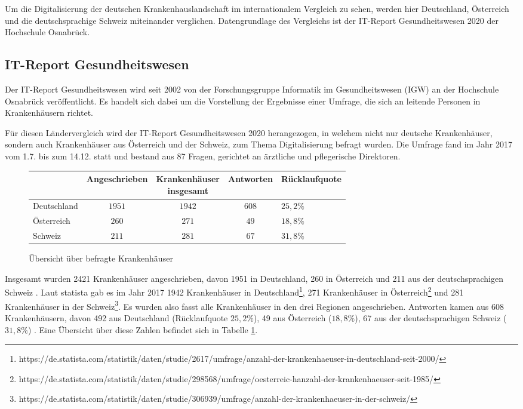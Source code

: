 Um die Digitalisierung der deutschen Krankenhauslandschaft im internationalem Vergleich zu sehen, werden hier Deutschland, Österreich und die deutschsprachige Schweiz miteinander verglichen. Datengrundlage des Vergleichs ist der IT-Report Gesundheitswesen 2020 der Hochschule Osnabrück.
\subsection{IT-Report Gesundheitswesen}
Der IT-Report Gesundheitswesen wird seit 2002 von der Forschungsgruppe Informatik im Gesundheitswesen (IGW) an der Hochschule Osnabrück veröffentlicht. Es handelt sich dabei um die Vorstellung der Ergebnisse einer Umfrage, die sich an leitende Personen in Krankenhäusern richtet. \parencite{huebner2019}

Für diesen Ländervergleich wird der IT-Report Gesundheitswesen 2020 herangezogen, in welchem nicht nur deutsche Krankenhäuser, sondern auch Krankenhäuser aus Österreich und der Schweiz, zum Thema Digitalisierung befragt wurden. Die Umfrage fand im Jahr 2017 vom 1.7. bis zum 14.12. statt und bestand aus 87 Fragen, gerichtet an ärztliche und pflegerische Direktoren.
\begin{figure}[h]
\begin{center}
	\begin{tabular}{l|c|c|c|l}
		&Angeschrieben&\parbox[c]{13ex}{\centering Krankenhäuser\\ insgesamt}&Antworten&Rücklaufquote\\
		\hline
		Deutschland&$1951$&$1942$&$608$&$25,2\%$\\
		Österreich&$260$&$271$&$49$&$18,8\%$\\
		Schweiz&$211$&$281$&$67$&$31,8\%$\\
	\end{tabular}
\end{center}
\caption{Übersicht über befragte Krankenhäuser}	
\label{tab:anzahl-krankenhaeuser}
\end{figure}
Insgesamt wurden 2421 Krankenhäuser angeschrieben, davon 1951 in Deutschland, 260 in Österreich und 211 aus der deutschsprachigen Schweiz \parencite{huebner2020}. Laut statista gab es im Jahr 2017 1942 Krankenhäuser in Deutschland\footnote{https://de.statista.com/statistik/daten/studie/2617/umfrage/anzahl-der-krankenhaeuser-in-deutschland-seit-2000/}, 271 Krankenhäuser in Österreich\footnote{https://de.statista.com/statistik/daten/studie/298568/umfrage/oesterreic-hanzahl-der-krankenhaeuser-seit-1985/} und 281 Krankenhäuser in der Schweiz\footnote{https://de.statista.com/statistik/daten/studie/306939/umfrage/anzahl-der-krankenhaeuser-in-der-schweiz/}. Es wurden also fasst alle Krankenhäuser in den drei Regionen angeschrieben. Antworten kamen aus 608 Krankenhäusern, davon 492 aus Deutschland (Rücklaufquote $25,2\%$), 49 aus Österreich ($18,8\%$), 67 aus der deutschsprachigen Schweiz ($31,8\%$) . Eine Übersicht über diese Zahlen befindet sich in Tabelle \ref{tab:anzahl-krankenhaeuser}.

